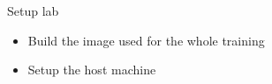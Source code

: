 \setuplabframe
{Setup lab}
{
  \begin{itemize}
  \item Build the image used for the whole training
  \item Setup the host machine
  \end{itemize}
}

